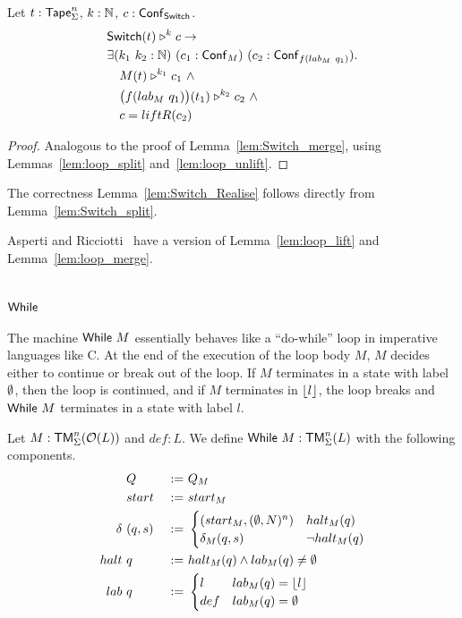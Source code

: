\begin{lemma}
  \label{lem:Switch_split}
  Let $t : \mathsf{Tape}_\Sigma^n$, $k : \mathbb{N}$, $c : \mathsf{Conf}_{\mathsf{Switch}}$.
  \begin{align*}
    & \mathsf{Switch}(t) \mathrel{\triangleright}^k c \rightarrow \\
    & \exists (k_1~k_2 : \mathbb{N})~(c_1 : \mathsf{Conf}_M)~(c_2 : \mathsf{Conf}_{f(lab_M~q_1)}). \\
    & \quad M(t) \mathrel{\triangleright}^{k_1} c_1 ~\land~ \\
    & \quad \bigl( f (lab_M~q_1) \bigr) (t_1) \mathrel{\triangleright}^{k_2} c_2 ~\land~ \\
    & \quad c = liftR(c_2)
  \end{align*}
\end{lemma}
\begin{proof}
  Analogous to the proof of Lemma~\ref{lem:Switch_merge}, using Lemmas~\ref{lem:loop_split} and~\ref{lem:loop_unlift}.
\end{proof}
The correctness Lemma~\ref{lem:Switch_Realise} follows directly from Lemma~\ref{lem:Switch_split}.


Asperti and Ricciotti~\cite{asperti2015} have a version of Lemma~\ref{lem:loop_lift} and Lemma~\ref{lem:loop_merge}.

\section{$\mathsf{While}$}
\label{sec:While}
%

The machine $\mathsf{While}~M$ essentially behaves like a ``do-while'' loop in imperative languages like C.  At the end of the execution of the loop body $M$,
$M$ decides either to continue or break out of the loop.  If $M$ terminates in a state with label $\emptyset$, then the loop is continued, and if $M$
terminates in $\left\lfloor {l} \right\rfloor$, the loop breaks and $\mathsf{While}~M$ terminates in a state with label $l$.

\begin{definition}[$\MS{While}~M$][While]
  \label{def:While}
  Let $M : \mathsf{TM}_\Sigma^n(\mathcal{O}(L))$ and $def:L$.  We define $\mathsf{While}~M : \mathsf{TM}_\Sigma^n(L)$ with the following components.
  \begin{alignat*}{3}
    & Q              &~:=~& Q_M \\
    & start          &~:=~& start_M \\
    \delta ~& (q, s) &~:=~&
    \begin{cases}
      (start_M, (\emptyset, N)^n) & halt_M(q) \\
      \delta_M (q,s)    & \lnot halt_M(q)
    \end{cases} \\
    halt ~& q      &~:=~& halt_M(q) \land lab_M(q) \neq \emptyset \\
    lab ~& q      &~:=~&
    \begin{cases}
      l   & lab_M(q) = \left\lfloor {l} \right\rfloor \\
      def & lab_M(q) = \emptyset
    \end{cases}
  \end{alignat*}
\end{definition}


